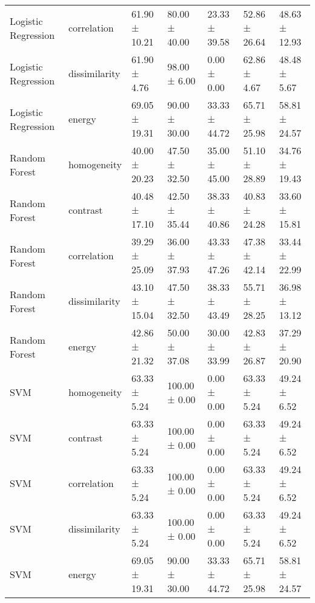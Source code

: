 \begin{tabular}{lllllll}
Logistic Regression & correlation & 61.90 ± 10.21 & 80.00 ± 40.00 & 23.33 ± 39.58 & 52.86 ± 26.64 & 48.63 ± 12.93 \\
Logistic Regression & dissimilarity & 61.90 ± 4.76 & 98.00 ± 6.00 & 0.00 ± 0.00 & 62.86 ± 4.67 & 48.48 ± 5.67 \\
Logistic Regression & energy & 69.05 ± 19.31 & 90.00 ± 30.00 & 33.33 ± 44.72 & 65.71 ± 25.98 & 58.81 ± 24.57 \\
Random Forest & homogeneity & 40.00 ± 20.23 & 47.50 ± 32.50 & 35.00 ± 45.00 & 51.10 ± 28.89 & 34.76 ± 19.43 \\
Random Forest & contrast & 40.48 ± 17.10 & 42.50 ± 35.44 & 38.33 ± 40.86 & 40.83 ± 24.28 & 33.60 ± 15.81 \\
Random Forest & correlation & 39.29 ± 25.09 & 36.00 ± 37.93 & 43.33 ± 47.26 & 47.38 ± 42.14 & 33.44 ± 22.99 \\
Random Forest & dissimilarity & 43.10 ± 15.04 & 47.50 ± 32.50 & 38.33 ± 43.49 & 55.71 ± 28.25 & 36.98 ± 13.12 \\
Random Forest & energy & 42.86 ± 21.32 & 50.00 ± 37.08 & 30.00 ± 33.99 & 42.83 ± 26.87 & 37.29 ± 20.90 \\
SVM & homogeneity & 63.33 ± 5.24 & 100.00 ± 0.00 & 0.00 ± 0.00 & 63.33 ± 5.24 & 49.24 ± 6.52 \\
SVM & contrast & 63.33 ± 5.24 & 100.00 ± 0.00 & 0.00 ± 0.00 & 63.33 ± 5.24 & 49.24 ± 6.52 \\
SVM & correlation & 63.33 ± 5.24 & 100.00 ± 0.00 & 0.00 ± 0.00 & 63.33 ± 5.24 & 49.24 ± 6.52 \\
SVM & dissimilarity & 63.33 ± 5.24 & 100.00 ± 0.00 & 0.00 ± 0.00 & 63.33 ± 5.24 & 49.24 ± 6.52 \\
SVM & energy & 69.05 ± 19.31 & 90.00 ± 30.00 & 33.33 ± 44.72 & 65.71 ± 25.98 & 58.81 ± 24.57 \\
\bottomrule
\end{tabular}
